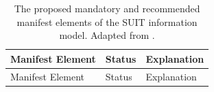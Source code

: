 \documentclass[0-thesis.tex]{subfiles}
\begin{document}
\begin{small}
\begin{longtable}[]{@{}lll@{}}
    \caption{The proposed mandatory and recommended manifest elements of the SUIT information model. Adapted from \parencite{suit-information-model}.}
    \label{tab:manifest-elements}\\
    \toprule
    \begin{minipage}[b]{0.23\columnwidth}\raggedright\strut
    Manifest Element\strut
    \end{minipage} & \begin{minipage}[b]{0.26\columnwidth}\raggedright\strut
    Status\strut
    \end{minipage} & \begin{minipage}[b]{0.42\columnwidth}\raggedright\strut
    Explanation\strut
    \end{minipage}\tabularnewline
    \midrule
    \endfirsthead
    \toprule
    \begin{minipage}[b]{0.23\columnwidth}\raggedright\strut
    Manifest Element\strut
    \end{minipage} & \begin{minipage}[b]{0.26\columnwidth}\raggedright\strut
    Status\strut
    \end{minipage} & \begin{minipage}[b]{0.42\columnwidth}\raggedright\strut
    Explanation\strut
    \end{minipage}\tabularnewline
    \midrule
    \endhead


\end{longtable}
\end{small}
\end{document}
